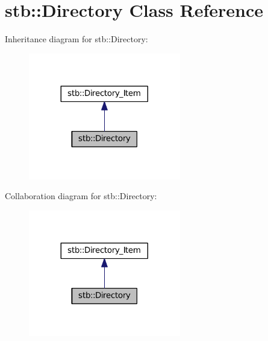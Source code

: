 \hypertarget{classstb_1_1Directory}{\section{stb\+:\+:Directory Class Reference}
\label{classstb_1_1Directory}
}


Inheritance diagram for stb\+:\+:Directory\+:
\nopagebreak
\begin{figure}[H]
\begin{center}
\leavevmode
\includegraphics[width=188pt]{classstb_1_1Directory__inherit__graph}
\end{center}
\end{figure}


Collaboration diagram for stb\+:\+:Directory\+:
\nopagebreak
\begin{figure}[H]
\begin{center}
\leavevmode
\includegraphics[width=188pt]{classstb_1_1Directory__coll__graph}
\end{center}
\end{figure}
